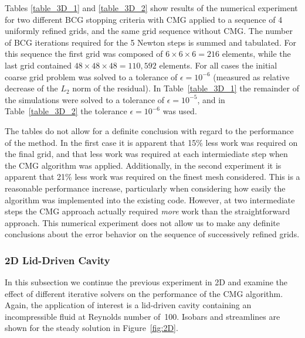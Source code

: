 Tables \ref{table_3D_1} and \ref{table_3D_2} show results of the numerical experiment for two different BCG stopping criteria with CMG applied to a sequence of 4 uniformly refined grids, and the same grid sequence without CMG.  The number of BCG iterations required for the 5 Newton steps is summed and tabulated.  For this sequence the first grid was composed of $6\times 6 \times 6=216$ elements, 
while the last grid contained $48\times 48\times 48=110,592$ elements. 
For all cases the initial coarse grid problem was solved to a tolerance of $\epsilon=10^{-6}$ (measured as relative decrease of the $L_2$ norm of the residual). In Table~\ref{table_3D_1} the remainder of the simulations were solved to a tolerance of $\epsilon=10^{-5}$, and in Table~\ref{table_3D_2} the tolerance $\epsilon=10^{-6}$ was used.

The tables do not allow for a definite conclusion with regard to the performance of the method.  In the first case it is apparent that 15\% less work was required on the final grid, and that less work was required at each intermiediate step when the CMG algorithm was applied.  Additionally, in the second experiment it is apparent that 21\% less work was required on the finest mesh considered.  This is a reasonable performance increase, particularly when considering how easily the algorithm was implemented into the existing code.  However, at two intermediate steps the CMG approach actually required \emph{more} work than the straightforward approach.  This numerical experiment does not allow us to make any definite conclusions about the error behavior on the sequence of successively refined grids.



\subsubsection{2D Lid-Driven Cavity}
In this subsection we continue the previous experiment in 2D and examine the effect of different iterative solvers on the performance of the CMG algorithm.  Again, the application of interest is a lid-driven cavity containing an incompressible fluid at Reynolds number of~100. Isobars and streamlines are shown for the steady solution in Figure~\ref{fig:2D}.

